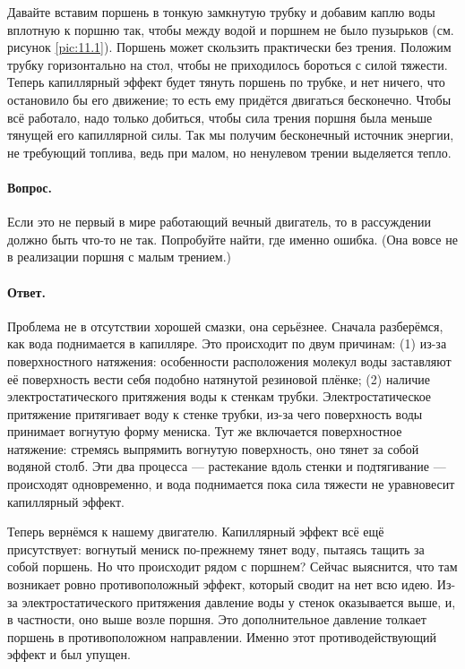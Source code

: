 Давайте вставим поршень в тонкую замкнутую трубку и добавим каплю воды вплотную к поршню так, чтобы между водой и поршнем не было пузырьков (см. рисунок \ref{pic:11.1}).
Поршень может скользить практически без трения.
Положим трубку горизонтально на стол, чтобы не приходилось бороться с силой тяжести.
Теперь капиллярный эффект будет тянуть поршень по трубке, и нет ничего, что остановило бы его движение;
то есть ему придётся двигаться бесконечно.
Чтобы всё работало, надо только добиться, чтобы сила трения поршня была меньше тянущей его капиллярной силы.
Так мы получим бесконечный источник энергии, не требующий топлива, ведь при малом, но ненулевом трении выделяется тепло.

\paragraph{Вопрос.}
Если это не первый в мире работающий вечный двигатель, то в рассуждении должно быть что-то не так.
Попробуйте найти, где именно ошибка.
(Она вовсе не в реализации поршня с малым трением.)

\paragraph{Ответ.}
Проблема не в отсутствии хорошей смазки, она серьёзнее.
Сначала разберёмся, как вода поднимается в капилляре.
Это происходит по двум причинам:
(1) из-за поверхностного натяжения:
особенности расположения молекул воды заставляют её поверхность вести себя подобно натянутой резиновой плёнке;
(2) наличие электростатического притяжения воды к стенкам трубки.
Электростатическое притяжение притягивает воду к стенке трубки, из-за чего поверхность воды принимает вогнутую форму мениска.
Тут же включается поверхностное натяжение: стремясь выпрямить вогнутую поверхность, оно тянет за собой водяной столб.
Эти два процесса --- растекание вдоль стенки и подтягивание --- происходят одновременно, и вода поднимается пока сила тяжести не уравновесит капиллярный эффект.

Теперь вернёмся к нашему двигателю.
Капиллярный эффект всё ещё присутствует: вогнутый мениск по-прежнему тянет воду, пытаясь тащить за собой поршень.
Но что происходит рядом с поршнем?
Сейчас выяснится, что там возникает ровно противоположный эффект, который сводит на нет всю идею.
Из-за электростатического притяжения давление воды у стенок оказывается выше, и, в частности, оно выше возле поршня.
Это дополнительное давление толкает поршень в противоположном направлении.
Именно этот противодействующий эффект и был упущен.%

